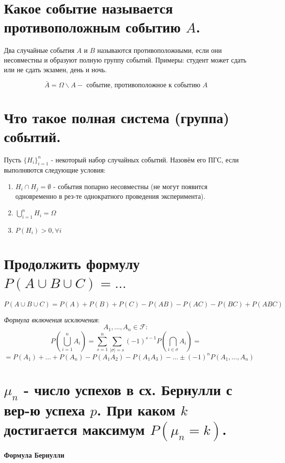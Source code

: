 \section{Какое событие называется противоположным событию $A$.}

Два случайные события $A$ и $B$ называются противоположными, если они несовместны и образуют полную группу событий. Примеры: студент может сдать или не сдать экзамен, день и ночь.

\[ \bar{A} = \Omega \backslash A - \text{ событие, противоположное к событию } A \]

\section{Что такое полная система (группа) событий.}

Пусть $ \{ H_i \}_{i=1}^n $ - некоторый набор случайных событий. Назовём его ПГС, если выполняются следующие условия:
\begin{enumerate}
	\item $H_i \cap H_j = \emptyset$ - события попарно несовместны (не могут появится одновременно в рез-те однократного проведения эксперимента).
	\item $\bigcup\limits_{i=1}^{n} H_i = \Omega$
	\item $P(H_i) > 0, \forall i$
\end{enumerate}

\section{Продолжить формулу $P(A \cup B \cup C) = \dots$}

\[ P(A \cup B \cup C) = P(A) + P(B) + P(C) - P(AB) - P(AC) - P(BC) + P(ABC) \]

\noindent \textit{Формула включения исключения}: 
\[A_1, \dots, A_n \in \mathcal{F}: \]
\[P \left(\bigcup_{i=1}^{n} A_i \right) = \sum_{s=1}^{n} \sum_{|\sigma| = s} (-1)^{s-1} P \left(\bigcap_{i \in \sigma} A_i \right) = \] 
\[= P(A_1) + \dots + P(A_n) - P(A_1 A_2) - P(A_1 A_3) - \dots \pm (-1)^n P(A_1, \dots, A_n) \]

\section{$\mu_n$ - число успехов в сх. Бернулли с вер-ю успеха $p$. При каком $k$ достигается максимум $P(\mu_n = k)$.}

\noindent \textbf{Формула Бернулли}

